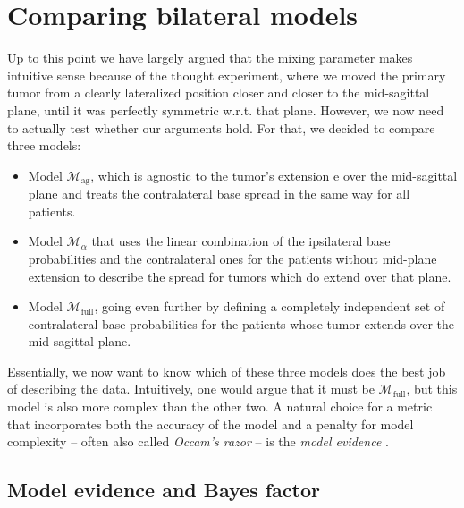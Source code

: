 \documentclass[\relativeRoot/main.tex]{subfiles}
\begin{document}
\section{Comparing bilateral models}
\label{sec:bilateral:model_comp}

Up to this point we have largely argued that the mixing parameter makes intuitive sense because of the thought experiment, where we moved the primary tumor from a clearly lateralized position closer and closer to the mid-sagittal plane, until it was perfectly symmetric w.r.t. that plane. However, we now need to actually test whether our arguments hold. For that, we decided to compare three models:

\begin{itemize}
    \item Model $\mathcal{M}_\text{ag}$, which is agnostic to the tumor's extension $\text{e}$ over the mid-sagittal plane and treats the contralateral base spread in the same way for all patients.
    \item Model $\mathcal{M}_\alpha$ that uses the linear combination of the ipsilateral base probabilities and the contralateral ones for the patients without mid-plane extension to describe the spread for tumors which do extend over that plane.
    \item Model $\mathcal{M}_\text{full}$, going even further by defining a completely independent set of contralateral base probabilities for the patients whose tumor extends over the mid-sagittal plane.
\end{itemize}

Essentially, we now want to know which of these three models does the best job of describing the data. Intuitively, one would argue that it must be $\mathcal{M}_\text{full}$, but this model is also more complex than the other two. A natural choice for a metric that incorporates both the accuracy of the model and a penalty for model complexity -- often also called \emph{Occam's razor} -- is the \emph{model evidence} \cite{aponte_introduction_2022}.

\subsection*{Model evidence and Bayes factor}
\label{subsec:bilateral:model_comp:evidence}
\end{document}
